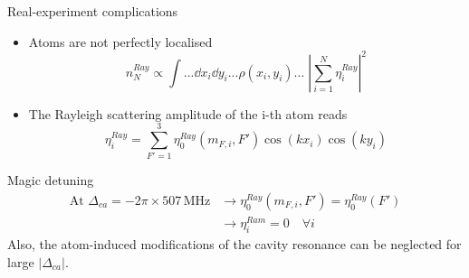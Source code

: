 \documentclass{beamer}
\begin{document}
\begin{frame}{Real-experiment complications}
	\begin{itemize}
		\item Atoms are not perfectly localised
		\vspace{-1em}
		\begin{equation*}
			n^{Ray}_N \propto \int...\dd{x_i}\dd{y_i}... \rho(x_i,y_i)...\; |\sum_{i=1}^N \eta^{Ray}_i|^2
		\end{equation*}
		\item The Rayleigh scattering amplitude of the i-th atom reads
		\vspace{-1em}
		\begin{equation*}
			\eta^{Ray}_i = \sum_{F'=1}^3\eta^{Ray}_0(m_{F,i},F')\cos(kx_i)\cos(ky_i)
		\end{equation*}
	\end{itemize}
\end{frame}

\begin{frame}{Magic detuning}
	\begin{align*}
		\text{At }\Delta_{ca}=-2\pi\times507\,\text{MHz}&\longrightarrow \eta^{Ray}_0(m_{F,i},F')=\eta^{Ray}_0(F')\\
		&\longrightarrow \eta^{Ram}_i=0 \quad\forall i
	\end{align*}
	Also, the atom-induced modifications of the cavity resonance can be neglected for large $|\Delta_{ca}|$.
\end{frame}
\end{document}
